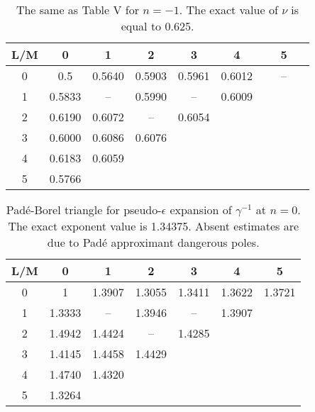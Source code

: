 \documentclass[aps,prb,preprint,showpacs,preprintnumbers,amsmath,amssymb]{revtex4}
\begin{document}
\begin{table}[t]
\caption{The same as Table V for $n = -1$. The exact value of $\nu$ is equal to 0.625.}
\label{tab6}
\renewcommand{\tabcolsep}{0.4cm}
\begin{tabular}{|*{7}{c|}}\hline
L/M & 0 & 1 & 2 & 3 & 4 & 5\\ \hline
0 & 0.5 & 0.5640 & 0.5903 & 0.5961 & 0.6012 & ~~~--~~~ \\ \hline
1 & 0.5833 & -- & 0.5990 & -- & 0.6009 & \\ \hline
2 & 0.6190 & 0.6072 & -- & 0.6054 & & \\ \hline
3 & 0.6000 & 0.6086 & 0.6076 & & & \\ \hline
4 & 0.6183 & 0.6059 & & & & \\ \hline
5 & 0.5766 & & & & & \\ \hline
\end{tabular}
\end{table}

\begin{table}[t]
\caption{Pad\'e-Borel triangle for pseudo-$\epsilon$ expansion of $\gamma^{-1}$ at $n = 0$.
The exact exponent value is 1.34375. Absent estimates are due to Pad\'e approximant
dangerous poles.}
\label{tab7}
\renewcommand{\tabcolsep}{0.4cm}
\begin{tabular}{|*{7}{c|}}\hline
L/M & 0 & 1 & 2 & 3 & 4 & 5 \\ \hline
0 & 1 & 1.3907 & 1.3055 & 1.3411 & 1.3622 & 1.3721 \\ \hline
1 & 1.3333 & -- & 1.3946 & -- & 1.3907 & \\ \hline
2 & 1.4942 & 1.4424 & -- & 1.4285 & & \\ \hline
3 & 1.4145 & 1.4458 & 1.4429 & & & \\ \hline
4 & 1.4740 & 1.4320 & & & & \\ \hline
5 & 1.3264 & & & & & \\ \hline
\end{tabular}
\end{table}
\end{document}
